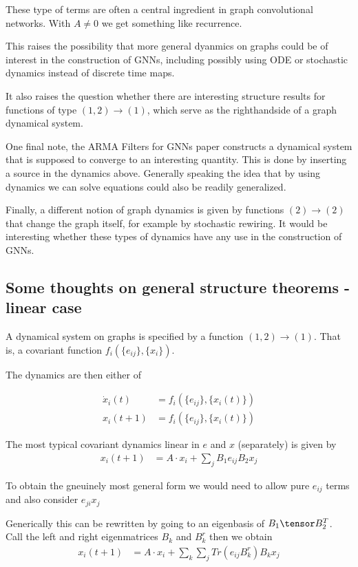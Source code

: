 \documentclass[reprint,twocolumn,amsmath,amssymb,aps]{revtex4-1}
\begin{document}
These type of terms are often a central ingredient in graph convolutional networks. With $A \neq 0$ we get something like recurrence.

This raises the possibility that more general dyanmics on graphs could be of interest in the construction of GNNs, including possibly using ODE or stochastic dynamics instead of discrete time maps.

It also raises the question whether there are interesting structure results for functions of type $(1, 2) \rightarrow (1)$, which serve as the righthandside of a graph dynamical system.

One final note, the ARMA Filters for GNNs paper constructs a dynamical system that is supposed to converge to an interesting quantity. This is done by inserting a source in the dynamics above. Generally speaking the idea that by using dynamics we can solve equations could also be readily generalized.

Finally, a different notion of graph dynamics is given by functions $(2) \rightarrow (2)$ that change the graph itself, for example by stochastic rewiring. It would be interesting whether these types of dynamics have any use in the construction of GNNs.

\subsection{Some thoughts on general structure theorems - linear case}

A dynamical system on graphs is specified by a function $(1, 2) \rightarrow (1)$. That is, a covariant function $f_i(\{e_{ij}\}, \{x_i\})$.

The dynamics are then either of

\begin{align}
\dot x_i(t) &= f_i(\{e_{ij}\}, \{x_i(t)\})\\
x_i(t + 1) &= f_i(\{e_{ij}\}, \{x_i(t)\})
\end{align}

The most typical covariant dynamics linear in $e$ and $x$ (separately) is given by
\begin{align}
x_i(t + 1) &= A \cdot x_i + \sum_j  B_1 e_{ij} B_2 x_j
\end{align}

To obtain the gneuinely most general form we would need to allow pure $e_{ij}$ terms and also consider $e_{ji} x_{j}$

Generically this can be rewritten by going to an eigenbasis of $B_1 \tensor B_2^T$. Call the left and right eigenmatrices $B_k$ and $B_k^r$ then we obtain 
\begin{align}
x_i(t + 1) &= A \cdot x_i + \sum_k \sum_j   Tr (e_{ij} B_k^r) B_k x_j
\end{align}
\end{document}

